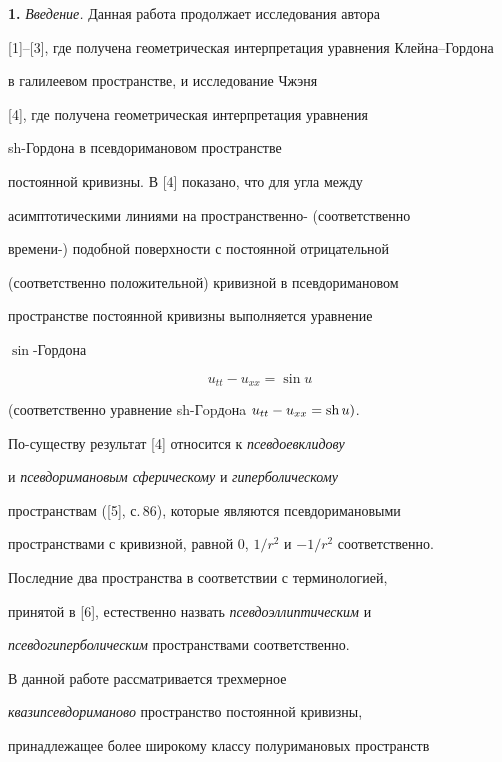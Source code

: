 \label{begin}








{\bf 1.} {\it Введение.} Данная работа продолжает исследования автора


[1]--[3], где получена геометрическая интерпретация уравнения Клейна--Гордона


в галилеевом пространстве, и исследование Чжэня


[4], где получена геометрическая интерпретация уравнения


sh-Гордона в псевдоримановом пространстве


постоянной кривизны. В [4] показано, что для угла между


асимптотическими линиями на пространственно- (соответственно


времени-) подобной поверхности с постоянной отрицательной


(соответственно положительной) кривизной в псевдоримановом


пространстве постоянной кривизны выполняется уравнение


$\sin$-Гордона


$$


u_{tt}-u_{xx}=\sin u


$$


(соответственно уравнение sh-Гopдoнa $u_{tt}-u_{xx}=\text{sh\,}u)$.


По-существу результат [4] относится к {\it псевдоевклидову}


и {\it псевдоримановым сферическому} и {\it гиперболическому}


пространствам ([5], с.\,86), которые являются псевдоримановыми


пространствами с кривизной, равной 0, $1/r^2$ и $-1/r^2$ соответственно.


Последние два пространства в соответствии с терминологией,


принятой в [6], естественно назвать {\it псевдоэллиптическим} и


{\it псевдогиперболическим} пространствами соответственно.





В данной работе рассматривается трехмерное


{\it квазипсевдориманово} пространство постоянной кривизны,


принадлежащее более широкому классу полуримановых пространств


